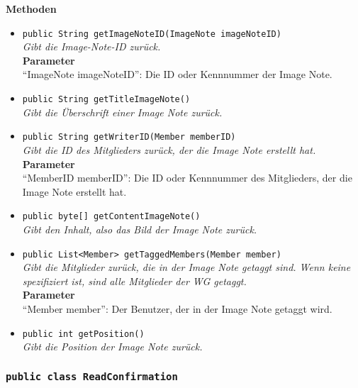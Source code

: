 	\textbf{Methoden}
	\begin{itemize}
		\item\texttt{{public String getImageNoteID(ImageNote imageNoteID)}}\\
		\textit{Gibt die Image-Note-ID zurück.}\\
		\textbf{Parameter}\\
		“ImageNote imageNoteID”: Die ID oder Kennnummer der Image Note.\\
		
		\item\texttt{{public String getTitleImageNote()}}\\
		\textit{Gibt die Überschrift einer Image Note zurück.}\\
		
		\item\texttt{{public String getWriterID(Member memberID)}}\\
		\textit{Gibt die ID des Mitglieders zurück, der die Image Note erstellt hat.}\\
		\textbf{Parameter}\\
		“MemberID memberID”: Die ID oder Kennnummer des Mitglieders, der die Image Note erstellt hat.\\
		
		\item\texttt{{public byte[] getContentImageNote()}}\\
		\textit{Gibt den Inhalt, also das Bild der Image Note zurück.}\\
		
		\item\texttt{{public List<Member> getTaggedMembers(Member member)}}\\
		\textit{Gibt die Mitglieder zurück, die in der Image Note getaggt sind. Wenn keine spezifiziert ist, sind alle Mitglieder der WG getaggt.}\\
		\textbf{Parameter}\\
		“Member member”: Der Benutzer, der in der Image Note getaggt wird.\\
		
		\item\texttt{{public int getPosition()}}\\
		\textit{Gibt die Position der Image Note zurück.}\\
	\end{itemize}

\subsubsection{\texttt{public class ReadConfirmation}}

